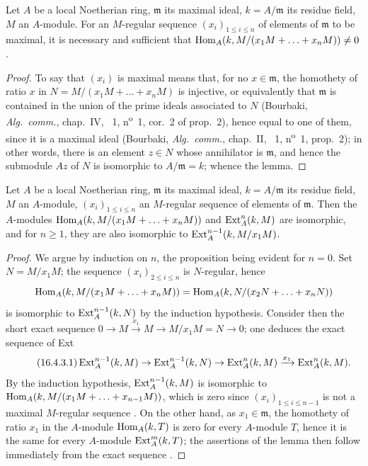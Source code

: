 \begin{lemma}[16.4.2]
\label{0.16.4.2}
Let $A$ be a local Noetherian ring, $\mathfrak{m}$ its maximal ideal, $k=A/\mathfrak{m}$ its residue field, $M$ an $A$-module.
For an $M$-regular sequence $(x_i)_{1\leq i\leq n}$ of elements of $\mathfrak{m}$ to be maximal, it is necessary and sufficient that $\operatorname{Hom}_A(k,M/(x_1M+\ldots+x_n M))\neq 0$.
\end{lemma}

\begin{proof}
To say that $(x_i)$ is maximal means that, for no $x\in\mathfrak{m}$, the homothety of ratio $x$ in $N=M/(x_1M+\ldots+x_n M)$ is injective, or equivalently that $\mathfrak{m}$ is contained in the union of the prime ideals associated to $N$ (Bourbaki, \emph{Alg.~comm.}, chap.~IV, \textsection~1, n\textsuperscript{o}~1, cor.~2 of prop.~2), hence equal to one of them, since it is a  maximal ideal (Bourbaki, \emph{Alg.~comm.}, chap.~II, \textsection~1, n\textsuperscript{o}~1, prop.~2); in other words, there is an element $z\in N$ whose annihilator is $\mathfrak{m}$, and hence the submodule $Az$ of $N$ is isomorphic to $A/\mathfrak{m}=k$; whence the lemma.
\end{proof}

\begin{lemma}[16.4.3]
\label{0.16.4.3}
Let $A$ be a local Noetherian ring, $\mathfrak{m}$ its maximal ideal, $k=A/\mathfrak{m}$ its residue field, $M$ an $A$-module, $(x_i)_{1\leq i\leq n}$ an $M$-regular sequence of elements of $\mathfrak{m}$.
Then the $A$-modules $\operatorname{Hom}_A(k,M/(x_1M+\ldots+x_n M))$ and $\operatorname{Ext}^n_A(k,M)$ are isomorphic, and for $n\geq 1$, they are also isomorphic to $\operatorname{Ext}^{n-1}_A(k,M/x_1M)$.
\end{lemma}

\begin{proof}
We argue by induction on $n$, the proposition being evident for $n=0$.
Set $N=M/x_1M$; the sequence $(x_i)_{2\leq i\leq n}$ is $N$-regular, hence
\[
  \operatorname{Hom}_A(k,M/(x_1M+\ldots+x_n M))=\operatorname{Hom}_A(k,N/(x_2N+\ldots+x_n N))
\]
is isomorphic to $\operatorname{Ext}^{n-1}_A(k,N)$ by the induction hypothesis.
Consider then the short exact sequence $0\to M\xrightarrow{x_1}M\to M/x_1M=N\to 0$; one deduces the exact sequence of Ext
\begin{equation}
\label{0.16.4.3.1}
\tag{16.4.3.1}
  \operatorname{Ext}^{n-1}_A(k,M)\to\operatorname{Ext}^{n-1}_A(k,N)\to\operatorname{Ext}^n_A(k,M)\xrightarrow{x_1}\operatorname{Ext}^n_A(k,M).
\end{equation}
By the induction hypothesis, $\operatorname{Ext}^{n-1}_A(k,M)$ is isomorphic to $\operatorname{Hom}_A(k,M/(x_1M+\ldots+x_{n-1}M))$, which is zero since $(x_i)_{1\leq i\leq n-1}$ is not a maximal $M$-regular sequence .
On the other hand, as $x_1\in\mathfrak{m}$, the homothety of ratio $x_1$ in the $A$-module $\operatorname{Hom}_A(k,T)$ is zero for every $A$-module $T$, hence it is the same for every $A$-module $\operatorname{Ext}^m_A(k,T)$; the assertions of the lemma then follow immediately from the exact sequence .
\end{proof}

